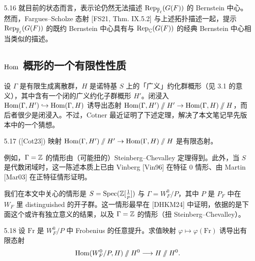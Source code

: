 \begin{rem}{5.16}
就目前的状态而言，表示论仍然无法描述 $\operatorname{Rep}_{\overline{\mathbb{F}}_\ell}(G(F))$ 的 Bernstein 中心。然而，Fargues--Scholze 态射 [FS21, Thm. IX.5.2] 与上述拓扑描述一起，提示 $\operatorname{Rep}_{\overline{\mathbb{F}}_\ell}(G(F))$ 的既约 Bernstein 中心具有与 $\operatorname{Rep}_{\mathbb{C}}(G(F))$ 的经典 Bernstein 中心相当类似的描述。
\end{rem}

\subsection{$\operatorname{Hom}$ 概形的一个有限性性质}
设 $\Gamma$ 是有限生成离散群，$H$ 是诺特基 $S$ 上的「广义」约化群概形（见 3.1 的意义），其中含有一个闭的广义约化子群概形 $H'$。闭浸入 $\operatorname{Hom}(\Gamma,H')\hookrightarrow\operatorname{Hom}(\Gamma,H)$ 诱导出态射 $\operatorname{Hom}(\Gamma,H')\sslash H'\to\operatorname{Hom}(\Gamma,H)\sslash H$，而后者很少是闭浸入。不过，Cotner 最近证明了下述定理，解决了本文笔记早先版本中的一个猜想。

\begin{thm}{5.17 ([Cot23])}
映射 $\operatorname{Hom}(\Gamma,H')\sslash H'\to\operatorname{Hom}(\Gamma,H)\sslash H$ 是有限态射。
\end{thm}

例如，$\Gamma=\mathbb{Z}$ 的情形由（可能扭的）Steinberg--Chevalley 定理得到。此外，当 $S$ 是代数闭域时，这一陈述本质上已由 Vinberg [Vin96] 在特征 $0$ 情形、由 Martin [Mar03] 在正特征情形证明。

我们在本文中关心的情形是 $S=\operatorname{Spec}(\mathbb{Z}[\frac1p])$ 与 $\Gamma=W_F^0/P$，其中 $P$ 是 $P_F$ 中在 $W_F$ 里 distinguished 的开子群。这一情形最早在 [DHKM24] 中证明，依据的是下面这个或许有独立意义的结果，以及 $\Gamma=\mathbb{Z}$ 的情形（扭 Steinberg--Chevalley）。

\begin{thm}{5.18}
设 $\mathrm{Fr}$ 是 $W_F^0/P$ 中 Frobenius 的任意提升。求值映射 $\varphi\mapsto\varphi(\mathrm{Fr})$ 诱导出有限态射
\[
\operatorname{Hom}(W_F^0/P,H)\sslash H^0\longrightarrow H\sslash H^0.
\]
\end{thm}

